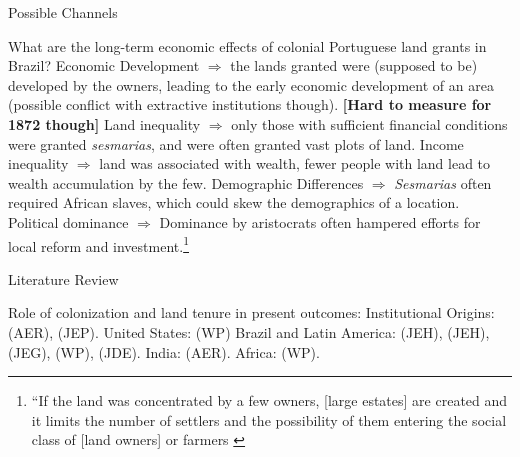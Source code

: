 \documentclass[aspectratio=1610, handout]{beamer}
\begin{document}
\begin{frame}{Possible Channels}
    \begin{outline}
        \1 What are the long-term economic effects of colonial Portuguese land grants in Brazil?
        \pause 
            \2 Economic Development $\Rightarrow$ the lands granted were (supposed to be) developed by the owners, leading to the early economic development of an area (possible conflict with extractive institutions though). \textbf{[Hard to measure for 1872 though]}
            \vspace{2mm}
            \pause 
            \2 Land inequality $\Rightarrow$ only those with sufficient financial conditions were granted \textit{sesmarias}, and were often granted vast plots of land.
            \pause 
            \vspace{2mm}
            \2 Income inequality $\Rightarrow$ land was associated with wealth, fewer people with land lead to wealth accumulation by the few.
            \pause 
            \vspace{2mm}
            \2 Demographic Differences $\Rightarrow$ \textit{Sesmarias} often required African slaves, which could skew the demographics of a location.
            \pause 
            \vspace{2mm}
            \2 Political dominance $\Rightarrow$ Dominance by aristocrats often hampered efforts for local reform and investment.\footnote[frame,1]{``If the land was concentrated by a few owners, [large estates] are created and it limits the number of settlers and the possibility of them entering the social class of [land owners] or farmers \parencite[p.~40]{Bandecchi1963-uj}}
    \end{outline}
\end{frame}

\begin{frame}{Literature Review}
    \begin{outline}
        \1 Role of colonization and land tenure in present outcomes:
            \vspace{2mm}
            \2 Institutional Origins: \cite{Acemoglu2001-dz} (AER), \cite{Sokoloff2000-mb} (JEP). 
            \vspace{2mm}
            \2 United States: \cite{Smith_undated-ip} (WP)
            \vspace{2mm}
            \2 Brazil and Latin America: \cite{Naritomi2012-or} (JEH), 
            \cite{Musacchio2014-pq} (JEH),
            \cite{Wigton-Jones2020-ex} (JEG),
            \cite{Laudares2022-vy} (WP),
            \cite{Sellars2018-yp} (JDE).
            \vspace{2mm}
            \2 India: \cites{Banerjee2005-ki} (AER).
            \vspace{2mm}
            \2 Africa: \cites{Lowes2020-pr} (WP).
    \end{outline}
\end{frame}
\end{document}
